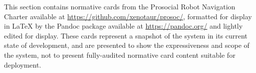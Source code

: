 \documentclass[utf8]{frontiers_suppmat} %
\begin{document}
\onecolumn
{}

\title[Supplementary Material]{{}}

\maketitle







This section contains normative cards from the Prosocial Robot Navigation Charter available at
\url{https://github.com/xenotaur/prosoc/}, formatted for display in LaTeX by the Pandoc package available at \url{https://pandoc.org/} and lightly edited for display. These cards represent a snapshot of the system in its current state of development, and are presented to show the expressiveness and scope of the system, not to present fully-audited normative card content suitable for deployment.
\end{document}
